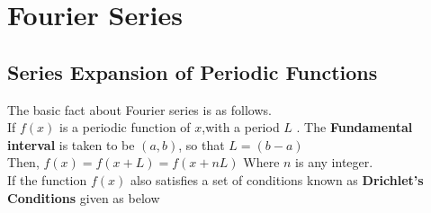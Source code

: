 \chapter{Fourier Series}
\section{Series Expansion of Periodic Functions}
The basic fact about Fourier series is as follows.\\
If $f(x)$ is a periodic function of $x$,with a period $L$ . The \textbf{Fundamental interval} is taken to be $(a,b)$, so that $L=(b-a)$\\
Then, $f(x)=f(x+L)=f(x+nL)$ Where $n$ is any integer.\\If the function $f(x)$ also satisfies a set of conditions known as \textbf{Drichlet's  Conditions} given as below\\

